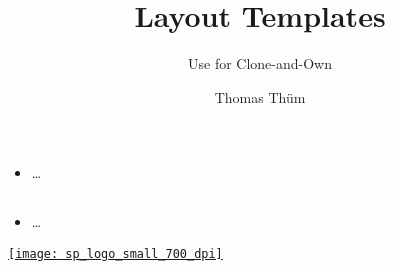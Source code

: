
\newcommand{\insertuulmtitle}{}
\graphicspath{{pics/}}

\author{Thomas Thüm}
\title{Layout Templates}
\subtitle{Use for Clone-and-Own}



\insertuulmtitle

\subsection{}
\begin{frame}{\insertsubsection}
	\begin{itemize}
		\item \ldots
	\end{itemize}
\end{frame}

\subsection{}
\begin{frame}{\insertsubsection}
	\begin{multicols}{2}
		\begin{itemize}
			\item \ldots
		\end{itemize}
		
		\begin{center}
			\href{}{\texttt{[image: sp\_logo\_small\_700\_dpi]}}
		\end{center}
	\end{multicols}
\end{frame}


